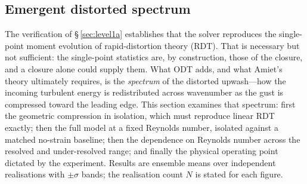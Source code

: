\documentclass[lineno]{JFM-FLM_Au}
\begin{document}
%
%

\subsection{Emergent distorted spectrum}\label{sec:val-spectrum}

The verification of \S\,\ref{sec:level1a} establishes that the solver
reproduces the single-point moment evolution of rapid-distortion theory (RDT).
That is necessary but not sufficient: the single-point statistics are, by
construction, those of the closure, and a closure alone could supply them.
What ODT adds, and what Amiet's theory ultimately requires, is the
\emph{spectrum} of the distorted upwash---how the incoming turbulent energy is
redistributed across wavenumber as the gust is compressed toward the leading
edge. This section examines that spectrum: first the geometric compression in
isolation, which must reproduce linear RDT exactly; then the full model at a
fixed Reynolds number, isolated against a matched no-strain baseline; then the
dependence on Reynolds number across the resolved and under-resolved range; and
finally the physical operating point dictated by the experiment. Results are
ensemble means over independent realisations with $\pm\sigma$ bands; the
realisation count $N$ is stated for each figure.
\end{document}

